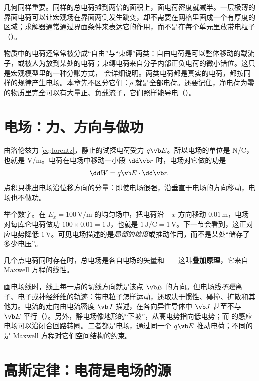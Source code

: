 几何同样重要。同样的总电荷摊到两倍的面积上，面电荷密度就减半。一层极薄的界面电荷可以让宏观场在界面两侧发生跳变，却不需要在网格里画成一个有厚度的区域；求解器通常通过界面条件来表达它的作用，而不是在每个单元里放带电粒子（）。

物质中的电荷还常常被分成“自由”与“束缚”两类：自由电荷是可以整体移动的载流子，或被人为放到某处的电荷；束缚电荷来自分子内部正负电荷的微小错位。这只是宏观模型里的一种分账方式， 会详细说明。两类电荷都是真实的电荷，都按同样的规律产生电场。本章先不区分它们：$\rho$ 就是全部电荷。还要记住，净电荷为零的物质里完全可以有大量正、负载流子，它们照样能导电（）。

\section{电场：力、方向与做功}\label{sec:electric-field}

由洛伦兹力 \eqref{eq:lorentz}，静止的试探电荷受力 $q\vb E$。所以电场的单位是 N/C，也就是 V/m。电荷在电场中移动一小段 $\dd\vb r$ 时，电场对它做的功是
\begin{equation}
\dd W=q\vb E\cdot\dd\vb r .
\label{eq:electric-work}
\end{equation}
点积只挑出电场沿位移方向的分量：即使电场很强，沿垂直于电场的方向移动，电场也不做功。

举个数字。在 $E_x=100\,\mathrm{V/m}$ 的均匀场中，把电荷沿 $+x$ 方向移动 $0.01\,\mathrm m$，电场对每库仑电荷做功 $100\times0.01=1\,\mathrm{J}$，也就是 $1\,\mathrm{J/C}=1\,\mathrm V$。下一节会看到，这正对应电势降低 $1\,\mathrm V$。可见电场描述的是\emph{局部的坡度}或推动作用，而不是某处“储存了多少电压”。

几个点电荷同时存在时，总电场是各自电场的矢量和——这叫\textbf{叠加原理}，它来自 Maxwell 方程的线性。

画电场线时，线上每一点的切线方向就是该点 $\vb E$ 的方向。但电场线\emph{不是}离子、电子或神经纤维的轨迹：带电粒子怎样运动，还取决于惯性、碰撞、扩散和其他力。电流的走向由电流密度 $\vb J$ 描述，在各向异性导体中 $\vb J$ 甚至不与 $\vb E$ 平行（）。另外，静电场像地形的“下坡”，从高电势指向低电势；而 的感应电场可以沿闭合回路转圈。二者都是电场，通过同一个 $q\vb E$ 推动电荷；不同的是 Maxwell 方程对它们空间结构的约束。

\section{高斯定律：电荷是电场的源}\label{sec:electric-gauss}

